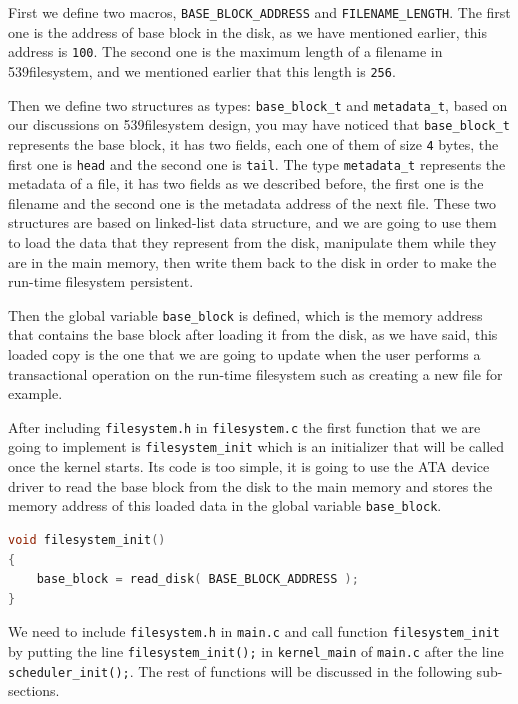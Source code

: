 First we define two macros, \lstinline!BASE_BLOCK_ADDRESS! and
\texttt{FILENAME\_LENGTH}. The first one is the address of base block
in the disk, as we have mentioned earlier, this address is
\lstinline!100!. The second one is the maximum length of a filename in
539filesystem, and we mentioned earlier that this length is
\lstinline!256!.

Then we define two structures as types: \lstinline!base_block_t! and
\lstinline!metadata_t!, based on our discussions on 539filesystem
design, you may have noticed that \lstinline!base_block_t! represents
the base block, it has two fields, each one of them of size
\lstinline!4! bytes, the first one is \lstinline!head! and the second
one is \lstinline!tail!. The type \lstinline!metadata_t! represents the
metadata of a file, it has two fields as we described before, the first
one is the filename and the second one is the metadata address of the
next file. These two structures are based on linked-list data structure,
and we are going to use them to load the data that they represent from
the disk, manipulate them while they are in the main memory, then write
them back to the disk in order to make the run-time filesystem
persistent.

Then the global variable \lstinline!base_block! is defined, which is the
memory address that contains the base block after loading it from the
disk, as we have said, this loaded copy is the one that we are going to
update when the user performs a transactional operation on the run-time
filesystem such as creating a new file for example.

After including \lstinline!filesystem.h! in \lstinline!filesystem.c! the
first function that we are going to implement is
\lstinline!filesystem_init! which is an initializer that will be called
once the kernel starts. Its code is too simple, it is going to use the
ATA device driver to read the base block from the disk to the main
memory and stores the memory address of this loaded data in the global
variable \lstinline!base_block!.

\begin{lstlisting}[language=C]
void filesystem_init()
{
    base_block = read_disk( BASE_BLOCK_ADDRESS );
}
\end{lstlisting}

We need to include \lstinline!filesystem.h! in \lstinline!main.c! and
call function \lstinline!filesystem_init! by putting the line
\lstinline!filesystem_init();! in \lstinline!kernel_main! of
\lstinline!main.c! after the line \lstinline!scheduler_init();!. The
rest of functions will be discussed in the following sub-sections.

